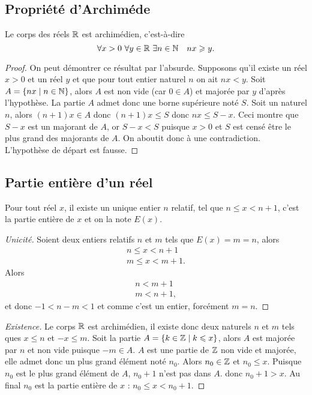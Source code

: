 \subsection{Propriété d'Archiméde}
\begin{prop}
  Le corps des réels $\mathbb{R}$ est archimédien, c'est-à-dire
  \begin{equation}
    \forall x>0 \ \forall y\in \R \ \exists n\in \N \quad nx\geqslant y.
  \end{equation}
\end{prop}
\begin{proof}
  On peut démontrer ce résultat par l'absurde. Supposons qu'il existe un réel $x>0$ et un réel $y$ et que pour tout entier naturel $n$ on ait $nx<y$. Soit $A=\left\{nx\mathrel{}\middle|\mathrel{}n\in \mathbb{N}\right\}$, alors $A$ est non vide (car $0\in A$) et majorée par $y$ d'après l'hypothèse. La partie $A$ admet donc une borne supérieure noté $S$. Soit un naturel $n$, alors $(n+1)x \in A$ donc $(n+1)x\leqslant S$ donc $nx \leqslant S-x$. Ceci montre que $S-x$ est un majorant de $A$, or $S-x<S$ puisque $x>0$ et $S$ est censé être le plus grand des majorants de $A$. On aboutit donc à une contradiction. L'hypothèse de départ est fausse.
\end{proof}

\subsection{Partie entière d'un réel}

\begin{prop}
  Pour tout réel $x$, il existe un unique entier $n$ relatif, tel que $n\leqslant x<n+1$, c'est la partie entière de $x$ et on la note $E(x)$.
\end{prop}
\begin{proof}[Unicité]
  Soient deux entiers relatifs $n$ et $m$ tels que $E(x)=m=n$, alors
  \begin{align}
    n\leqslant x< n+1 \\  m\leqslant x< m+1.
  \end{align}
  Alors
  \begin{align}
    n<m+1 \\  m<n+1,
  \end{align}
  et donc $-1<n-m<1$ et comme c'est un entier, forcément $m=n$.
\end{proof}
\begin{proof}[Existence]
  Le corps $\mathbb{R}$ est archimédien, il existe donc deux naturels $n$ et $m$ tels ques $x\leqslant n$ et  $-x\leqslant m$. Soit la partie $A=\left\{k \in \mathbb{Z}\mathrel{}\middle|\mathrel{}k\leqslant x\right\}$, alors $A$ est majorée par $n$ et non vide puisque $-m\in A$. $A$ est une partie de $\mathbb{Z}$ non vide et majorée, elle admet donc un plus grand élément noté $n_0$. Alors $n_0\in \mathbb{Z}$ et $n_0\leqslant x$. Puisque $n_0$ est le plus grand élément de $A$, $n_0+1$ n'est pas dans $A$. donc $n_0+1>x$. Au final $n_0$ est la partie entière de $x$ : $n_0\leqslant x<n_0+1$.
\end{proof}

